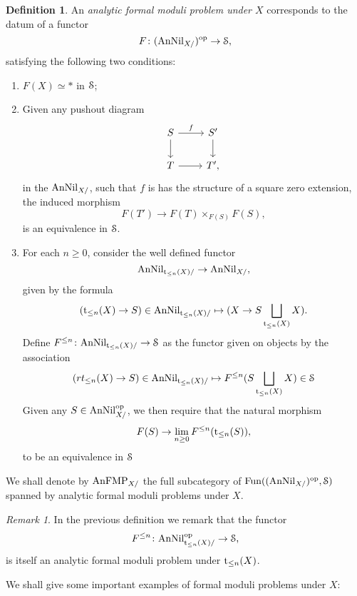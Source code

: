 \documentclass[10pt,a4paper,reqno]{amsart} %
\theoremstyle{plain}
\theoremstyle{definition}
\newtheorem{defin}[thm]{Definition}
\theoremstyle{remark}
\newtheorem{rem}[thm]{Remark}
\numberwithin{equation}{section}
\begin{document}
\begin{defin} \label{defin:analytic_formal_moduli_problems_under}
    An \emph{analytic formal moduli problem under $X$} corresponds to the datum of a functor
        \[F \colon (\mathrm{AnNil}_{X/})^\mathrm{op} \to \mathcal S,\]
    satisfying the following two conditions:
    \begin{enumerate}
        \item $F(X) \simeq *$ in $\mathcal S$;
        \item Given any pushout diagram
            \[\begin{tikzcd}
                S \ar{r}{f} \ar{d} & S' \ar{d} \\
                T \ar{r} & T',
            \end{tikzcd}\]
        in the \infcat $\mathrm{AnNil}_{X/}$, such that $f$ is has the structure of a square zero extension, the induced morphism
            \[F(T') \to F(T) \times_{F(S)}F(S),\]
        is an equivalence in $\mathcal S$.
        \item For each $n \ge 0$, consider the well defined functor
            \[
                 \mathrm{AnNil}_{\mathrm{t}_{\le n}(X)/ } \to \mathrm{AnNil}_{X/ },  
            \]
        given by the formula
            \[
                (\mathrm t_{\le n}(X) \to S) \in \mathrm{AnNil}_{\mathrm t_{\le n}(X)/ } \mapsto ( X \to S \bigsqcup_{\mathrm t_{\le n}(X)} X ).
            \]
        Define $F^{\le n} \colon \mathrm{AnNil}_{\mathrm t_{\le n}(X)/ } \to \mathcal S$ as the functor given on objects by the association
            \[
                (rt_{\le n}(X) \to S) \in \mathrm{AnNil}_{\mathrm t_{\le n}(X)/ } \mapsto  F^{\le n}(S \bigsqcup_{\mathrm t_{\le n}(X)} X) \in \mathcal S  
            \]
        Given any $S \in \mathrm{AnNil}^\mathrm{op}_{X/ }$, we then require that the natural morphism
            \[
                F(S) \to \lim_{n \ge 0} F^{\le n}(\mathrm t_{\le n}(S)),  
            \]
        to be an equivalence in $\mathcal S$
    \end{enumerate}
    We shall denote by $\mathrm{AnFMP}_{X/}$ the full subcategory of $\operatorname{Fun}((\mathrm{AnNil}_{X/ })^\mathrm{op}, \mathcal S)$ spanned by analytic formal moduli problems
    under $X$.
\end{defin}

\begin{rem}
    In the previous definition we remark that the functor
        \[
            F^{\le n} \colon \mathrm{AnNil}^\mathrm{op}_{\mathrm t_{\le n}(X)/ } \to \mathcal S,  
        \]
    is itself an analytic formal moduli problem under $\mathrm t_{\le n}(X)$.
\end{rem}

We shall give some important examples of formal moduli problems under $X$:
\end{document}
